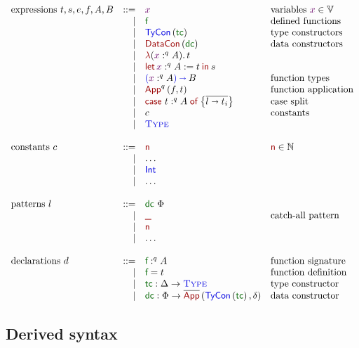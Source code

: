 \documentclass{article}
\newcommand{\OF}{:}
\newcommand{\OFq}[1]{\OF^{#1}}
\newcommand{\type}[1]{{\textcolor{type}{\textsf{#1}}}}
\newcommand{\term}[1]{{\textcolor{term}{\textsf{#1}}}}
\newcommand{\definition}[1]{{\textcolor{definition}{\textsf{#1}}}}
\newcommand{\unv}[1]{{\textcolor{type}{\textsc{#1}}}}
\newcommand{\name}[1]{{\textcolor{neutral}{#1}}}
\newcommand{\Type}{\unv{Type}}
\newcommand{\To}{\mathbin{\textcolor{type}{\shortrightarrow}}}
\newcommand{\App}[3]{\term{App}^{#1}\left(#2,#3\right)}
\newcommand{\AppTele}[2]{\overline{\term{App}}\left(#1, #2\right)}
\newcommand{\TyCon}[1]{\type{TyCon}\left({\definition {#1}}\right)}
\newcommand{\DataCon}[1]{\term{DataCon}\left({\definition {#1}}\right)}
\newcommand{\lam}[3]{\textcolor{term}{\lambda} {(\name {#1} \OFq {#2} {#3})}.\,}
\newcommand{\Let}[5]{\term{let}\, {\name #1} \OFq {#2} {#3} := {#4} \mathbin{\term{in}} {#5}}
\newcommand{\Case}[4]{\term{case}~ {#1} \OFq {#2} {#3} \mathrel{\term{of}} \left\{\overline{#4}\right\}}
\newcommand{\Clause}[2]{{#1} \shortrightarrow {#2}}
\newcommand{\PiT}[4]{\textcolor{type}{(}\name #1 \OF^{#2} #3 \textcolor{type}{)} \To #4}
\begin{document}
$$
\begin{array}{lrll}
  \text{expressions } {t, s, e, f, A, B} &\mathrel{\text{::=}} &\name x & \text{variables ${\name x} \in \mathbb V$}\\
  &\mid &\definition f & \text{defined functions}\\
  &\mid &\TyCon {\definition tc} & \text{type constructors}\\
  &\mid &\DataCon {\definition dc} & \text{data constructors}\\
  &\mid &\lam x q A t\\
  &\mid &\Let x q A t s\\
  &\mid &\PiT x q A B & \text{function types}\\
  &\mid &\App q f t & \text{function application}\\
  &\mid &\Case t q A {\Clause l {t_i}} & \text{case split}\\
  &\mid &c & \text{constants}\\
  &\mid &\Type\\
  \\
  \text{constants } {c} &\mathrel{\text{::=}} &\term{n} & \text{$\term{n} \in \mathbb N$}\\
  &\mid &\ldots\\
  &\mid &\type{Int}\\
  &\mid &\ldots\\
  \\
  \text{patterns } {l} &\mathrel{\text{::=}} &\definition{dc}~ \Phi \\
  &\mid &\term{\_} & \text{catch-all pattern} \\
  &\mid &\term{n}\\
  &\mid &\ldots\\
  \\
  \text{declarations } {d} &\mathrel{\text{::=}} &\definition f \OFq q A & \text{function signature}\\
  &\mid &\definition f = t & \text{function definition}\\
  &\mid &\definition{tc} \OF \Delta \to \Type & \text{type constructor}\\
  &\mid &\definition{dc} \OF \Phi \to \AppTele {\TyCon {\definition {tc}}} \delta  & \text{data constructor}
\end{array}
$$

\subsection{Derived syntax}
\end{document}
